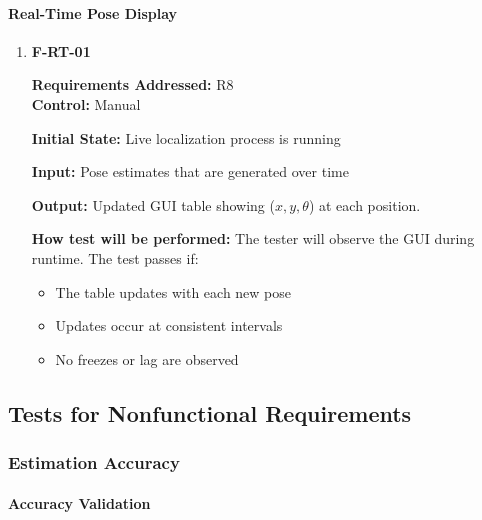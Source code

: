 \documentclass[12pt, titlepage]{article}
\begin{document}
\paragraph{Real-Time Pose Display}

\begin{enumerate}

\item{\textbf{F-RT-01}}

\textbf{Requirements Addressed:} R8\\
\textbf{Control:} Manual
					
\textbf{Initial State: }Live localization process is running 
					
\textbf{Input:} Pose estimates that are generated over time

\textbf{Output:} Updated GUI table showing ($x, y, \theta$) at each position.
					
\textbf{How test will be performed:} The tester will observe the GUI during runtime. The test passes if:
\begin{itemize}
  \item The table updates with each new pose
  \item Updates occur at consistent intervals
  \item No freezes or lag are observed
\end{itemize}

\end{enumerate}

\subsection{Tests for Nonfunctional Requirements}


\subsubsection{Estimation Accuracy}
		
\paragraph{Accuracy Validation}
\end{document}
